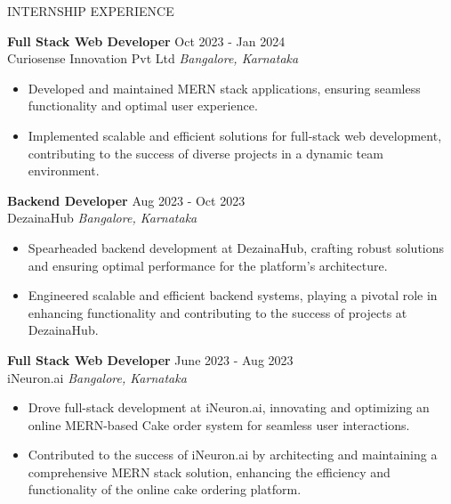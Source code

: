 \documentclass{resume} %
\begin{document}
\begin{rSection}{INTERNSHIP EXPERIENCE}

\textbf{Full Stack Web Developer} \hfill Oct 2023 - Jan 2024\\
Curiosense Innovation Pvt Ltd \hfill \textit{Bangalore, Karnataka}
 \begin{itemize}
    \itemsep -3pt {} 
     \item Developed and maintained MERN stack applications, ensuring seamless functionality and optimal user experience.
     \item Implemented scalable and efficient solutions for full-stack web development, contributing to the success of diverse
projects in a dynamic team environment.
 \end{itemize}
 
\textbf{Backend Developer} \hfill Aug 2023 - Oct 2023\\
DezainaHub \hfill \textit{Bangalore, Karnataka}
 \begin{itemize}
    \itemsep -3pt {} 
     \item Spearheaded backend development at DezainaHub, crafting robust solutions and ensuring optimal performance for the
platform's architecture.

     \item Engineered scalable and efficient backend systems, playing a pivotal role in enhancing functionality and contributing to
the success of projects at DezainaHub.

 \end{itemize}

 \textbf{Full Stack Web Developer} \hfill June 2023 - Aug 2023\\
iNeuron.ai \hfill \textit{Bangalore, Karnataka}
 \begin{itemize}
    \itemsep -3pt {} 
     \item Drove full-stack development at iNeuron.ai, innovating and optimizing an online MERN-based Cake order system for
seamless user interactions.

     \item Contributed to the success of iNeuron.ai by architecting and maintaining a comprehensive MERN stack solution,
enhancing the efficiency and functionality of the online cake ordering platform.

 \end{itemize}

\end{rSection} 

\end{document}
